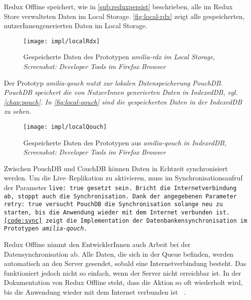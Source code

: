 %
%
Redux Offline speichert, wie in \autoref{sub:reduxpersist} beschrieben, alle im Redux Store verwalteten Daten im Local Storage.
\autoref{fig:local-rdx} zeigt alle gespeicherten, nutzerInnengenerierten Daten im Local Storage.
%
\begin{figure}[H]
  \centering
  \texttt{[image: impl/localRdx]}
  \grayRule
  \caption[Gespeicherte Daten im Local Storage]{Gespeicherte Daten des Prototypen \it{amilia-rdx} im Local Storage,\\Screenshot: Developer Tools im Firefox Browser}
  \label{fig:local-rdx}
\end{figure}
% 
Der Prototyp \it{amilia-qouch} nutzt zur lokalen Datenspeicherung PouchDB. PouchDB speichert die von NutzerInnen generierten Daten in IndexedDB, vgl. \autoref{chap:pouch}. In \autoref{fig:local-qouch} sind die gespeicherten Daten in der IndexedDB zu sehen.
%
\begin{figure}[H]
  \centering
  \texttt{[image: impl/localQouch]}
  \grayRule
  \caption[Gespeicherte Daten in IndexedDB]{Gespeicherte Daten des Prototypen aus \it{amilia-qouch} in IndexedDB,\\Screenshot: Developer Tools im Firefox Browser}
  \label{fig:local-qouch}
\end{figure}
%
%
Zwischen PouchDB und CouchDB können Daten in Echtzeit synchronisiert werden.
Um die Live--Replikation zu aktivieren, muss im Synchronisationsaufruf der Parameter \tt{live: true} gesetzt sein.
Bricht die Internetverbindung ab, stoppt auch die Synchronisation.
Dank der angegebenen Parameter \tt{retry: true} versucht PouchDB die Synchronisation solange neu zu starten, bis die Anwendung wieder mit dem Internet verbunden ist. \autoref{code:sync} zeigt die Implementation der Datenbankensynchronisation im Prototypen \it{amilia-qouch}.
%
\begin{center}
  
\end{center}
% 
Redux Offline nimmt den EntwicklerInnen auch Arbeit bei der Datensynchronisation ab.
Alle Daten, die sich in der Queue befinden, werden automatisch an den Server gesendet, sobald eine Internetverbindung besteht.
Das funktioniert jedoch nicht so einfach, wenn der Server nicht erreichbar ist.
In der Dokumentation von Redux Offline steht, dass die Aktion so oft wiederholt wird, bis die Anwendung wieder mit dem Internet verbunden ist ~\cite{giving-up}.
